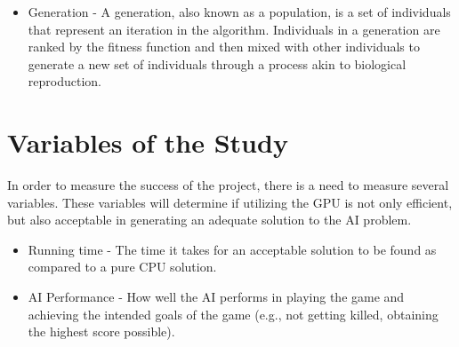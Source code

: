 \begin{itemize}
 \item Generation - A generation, also known as a population, is a set of individuals that represent
an iteration in the algorithm. Individuals in a generation are ranked by the fitness function and then
mixed with other individuals to generate a new set of individuals through a process akin to biological
reproduction.

\end{itemize}

\section{Variables of the Study}

In order to measure the success of the project, there is a need to measure several variables. These
variables will determine if utilizing the GPU is not only efficient, but also acceptable in generating
an adequate solution to the AI problem.

\begin{itemize}
 \item Running time - The time it takes for an acceptable solution to be found as compared to
a pure CPU solution.

 \item AI Performance - How well the AI performs in playing the game and achieving the intended goals
of the game (e.g., not getting killed, obtaining the highest score possible).
\end{itemize}